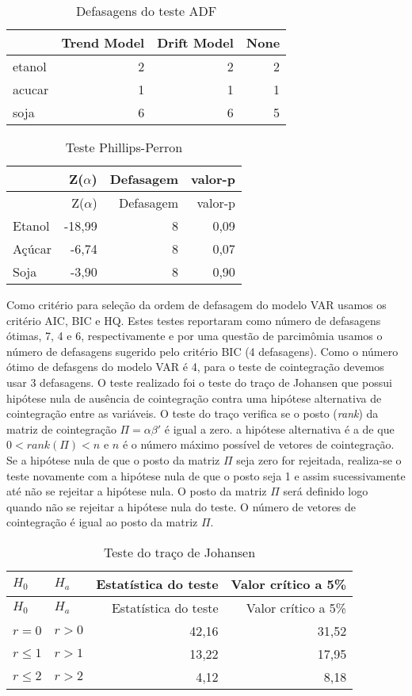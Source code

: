 \begin{longtable}[t]{lrrr}
\caption{\label{tab:ADF e KPSS nivel}Defasagens do teste ADF}\\
\toprule
  & Trend Model & Drift Model & None\\
\midrule
etanol & 2 & 2 & 2\\
acucar & 1 & 1 & 1\\
soja & 6 & 6 & 5\\
\bottomrule
\end{longtable}

\begin{longtable}[]{@{}lrrr@{}}
\caption{Teste Phillips-Perron}\tabularnewline
\toprule
& Z(\(\alpha\)) & Defasagem & valor-p\tabularnewline
\midrule
\endfirsthead
\toprule
& Z(\(\alpha\)) & Defasagem & valor-p\tabularnewline
\midrule
\endhead
Etanol & -18,99 & 8 & 0,09\tabularnewline
Açúcar & -6,74 & 8 & 0,07\tabularnewline
Soja & -3,90 & 8 & 0,90\tabularnewline
\bottomrule
\end{longtable}

Como critério para seleção da ordem de defasagem do modelo VAR usamos os
critério AIC, BIC e HQ. Estes testes reportaram como número de
defasagens ótimas, 7, 4 e 6, respectivamente e por uma questão de
parcimômia usamos o número de defasagens sugerido pelo critério BIC (4
defasagens). Como o número ótimo de defasgens do modelo VAR é 4, para o
teste de cointegração devemos usar 3 defasagens. O teste realizado foi o
teste do traço de Johansen que possui hipótese nula de ausência de
cointegração contra uma hipótese alternativa de cointegração entre as
variáveis. O teste do traço verifica se o posto (\emph{rank}) da matriz
de cointegração \(\Pi = \alpha \beta'\) é igual a zero. a hipótese
alternativa é a de que \(0<rank(\Pi)<n\) e \(n\) é o número máximo
possível de vetores de cointegração. Se a hipótese nula de que o posto
da matriz \(\Pi\) seja zero for rejeitada, realiza-se o teste novamente
com a hipótese nula de que o posto seja 1 e assim sucessivamente até não
se rejeitar a hipótese nula. O posto da matriz \(\Pi\) será definido
logo quando não se rejeitar a hipótese nula do teste. O número de
vetores de cointegração é igual ao posto da matriz \(\Pi\).

\begin{longtable}[]{@{}llrr@{}}
\caption{Teste do traço de Johansen}\tabularnewline
\toprule
\(H_0\) & \(H_a\) & Estatística do teste & Valor crítico a
5\%\tabularnewline
\midrule
\endfirsthead
\toprule
\(H_0\) & \(H_a\) & Estatística do teste & Valor crítico a
5\%\tabularnewline
\midrule
\endhead
\(r=0\) & \(r>0\) & 42,16 & 31,52\tabularnewline
\(r\leq 1\) & \(r>1\) & 13,22 & 17,95\tabularnewline
\(r\leq 2\) & \(r>2\) & 4,12 & 8,18\tabularnewline
\bottomrule
\end{longtable}

